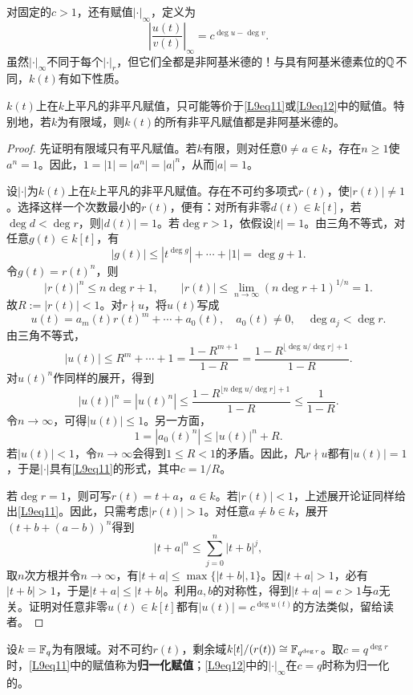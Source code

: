 对固定的$c>1$，还有赋值$|\cdot|_\infty$，定义为
\begin{equation}\tag{1.2}\label{L9eq12}
\left|\frac{u(t)}{v(t)}\right|_\infty=c^{\deg u-\deg v}.
\end{equation}
虽然$|\cdot|_\infty$不同于每个$|\cdot|_r$，但它们全都是非阿基米德的！与具有阿基米德素位的$\mathbb{Q}$不同，$k(t)$有如下性质。
\begin{lemma}\label{L9S1O1}
$k(t)$上在$k$上平凡的非平凡赋值，只可能等价于\eqref{L9eq11}或\eqref{L9eq12}中的赋值。特别地，若$k$为有限域，则$k(t)$的所有非平凡赋值都是非阿基米德的。
\end{lemma}
\begin{proof}
先证明有限域只有平凡赋值。若$k$有限，则对任意$0\ne a\in k$，存在$n\geq1$使$a^n=1$。因此，$1=|1|=|a^n|=|a|^n$，从而$|a|=1$。

设$|\cdot|$为$k(t)$上在$k$上平凡的非平凡赋值。存在不可约多项式$r(t)$，使$|r(t)|\ne1$。选择这样一个次数最小的$r(t)$，便有：对所有非零$d(t)\in k[t]$，若$\deg d<\deg r$，则$|d(t)|=1$。若$\deg r>1$，依假设$|t|=1$。由三角不等式，对任意$g(t)\in k[t]$，有
\[|g(t)|\leq|t^{\deg g}|+\cdots+|1|=\deg g+1.\]
令$g(t)=r(t)^n$，则
\[|r(t)|^n\leq n\deg r+1,\qquad |r(t)|\leq\lim_{n\to\infty}(n\deg r+1)^{1/n}=1.\]
故$R:=|r(t)|<1$。对$r\nmid u$，将$u(t)$写成
\[u(t)=a_m(t)r(t)^m+\cdots+a_0(t),\quad a_0(t)\ne0,\quad\deg a_j<\deg r.\]
由三角不等式，
\[|u(t)|\leq R^m+\cdots+1=\frac{1-R^{m+1}}{1-R}=\frac{1-R^{\lfloor\deg u/\deg r\rfloor+1}}{1-R}.\]
对$u(t)^n$作同样的展开，得到
\[|u(t)|^n=|u(t)^n|\leq\frac{1-R^{\lfloor n\deg u/\deg r\rfloor+1}}{1-R}\leq\frac1{1-R}.\]
令$n\to\infty$，可得$|u(t)|\leq1$。另一方面，
\[1=|a_0(t)^n|\leq|u(t)|^n+R.\]
若$|u(t)|<1$，令$n\to\infty$会得到$1\leq R<1$的矛盾。因此，凡$r\nmid u$都有$|u(t)|=1$，于是$|\cdot|$具有\eqref{L9eq11}的形式，其中$c=1/R$。

若$\deg r=1$，则可写$r(t)=t+a$，$a\in k$。若$|r(t)|<1$，上述展开论证同样给出\eqref{L9eq11}。因此，只需考虑$|r(t)|>1$。对任意$a\ne b\in k$，展开$(t+b+(a-b))^n$得到
\[|t+a|^n\leq\sum_{j=0}^n|t+b|^j,\]
取$n$次方根并令$n\to\infty$，有$|t+a|\leq\max\{|t+b|,1\}$。因$|t+a|>1$，必有$|t+b|>1$，于是$|t+a|\leq|t+b|$。利用$a,b$的对称性，得到$|t+a|=c>1$与$a$无关。证明对任意非零$u(t)\in k[t]$都有$|u(t)|=c^{\deg u(t)}$的方法类似，留给读者。
\end{proof}
设$k=\mathbb{F}_q$为有限域。对不可约$r(t)$，剩余域$k[t]/(r(t))\cong\mathbb{F}_{q^{\deg r}}$。取$c=q^{\deg r}$时，\eqref{L9eq11}中的赋值称为\textbf{归一化赋值}；\eqref{L9eq12}中的$|\cdot|_\infty$在$c=q$时称为归一化的。

